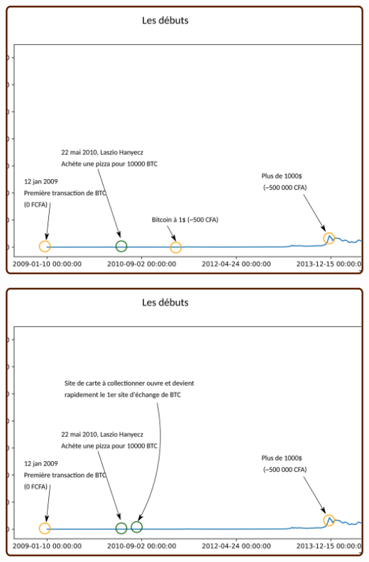 \documentclass[presentation]{beamer}
\begin{document}
\begin{frame}[label={sec:org0a5e132}]{}
\begin{center}
\includegraphics[width=.95\textwidth]{./Pictures/Timeline/04debut_pizza.png}
\end{center}
\end{frame}

\begin{frame}[label={sec:org2fb149c}]{}
\begin{center}
\includegraphics[width=.95\textwidth]{./Pictures/Timeline/05debut_mtdox.png}
\end{center}
\end{frame}
\end{document}
